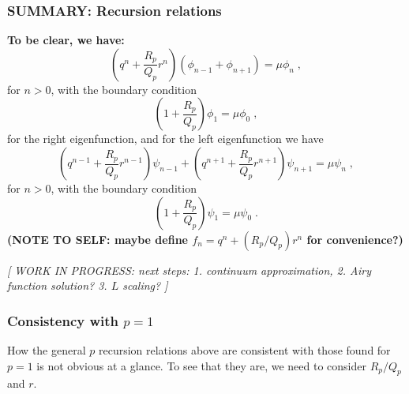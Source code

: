 \documentclass[a4paper,10pt]{article}
\begin{document}
\subsubsection{SUMMARY: Recursion relations}

{\bf To be clear, we have:}
\begin{equation}
 \left( q^n + \frac{R_p}{Q_p} r^n \right) \left( \phi_{n-1} + \phi_{n+1} \right) = \mu \phi_n \;,
\end{equation}
for $n>0$, with the boundary condition
\begin{equation}
  \left( 1 + \frac{R_p}{Q_p} \right) \phi_1 = \mu \phi_0 \;,
\end{equation}
for the right eigenfunction, and for the left eigenfunction we have
\begin{equation}
 \left( q^{n-1} + \frac{R_p}{Q_p} r^{n-1} \right) \psi_{n-1} + \left( q^{n+1} + \frac{R_p}{Q_p} r^{n+1} \right) \psi_{n+1} = \mu \psi_n \;,
\end{equation}
for $n>0$, with the boundary condition
\begin{equation}
 \left( 1 + \frac{R_p}{Q_p} \right) \psi_1 = \mu \psi_0 \;.
\end{equation}
{\bf (NOTE TO SELF: maybe define $f_n = q^n + (R_p/Q_p)r^n$ for convenience?)}

\emph{[ WORK IN PROGRESS: next steps: 1. continuum approximation, 2. Airy function solution? 3. $L$ scaling? ]}

\subsubsection{Consistency with $p=1$}

How the general $p$ recursion relations above are consistent with those found for $p=1$ is not obvious at a glance. To see that they are, we need to consider $R_p/Q_p$ and $r$.
\end{document}
